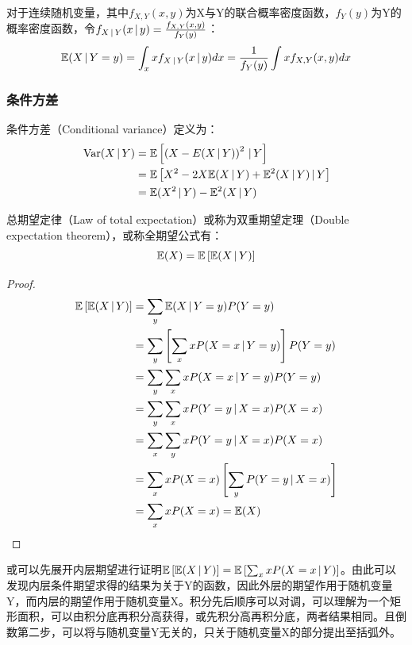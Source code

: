 \documentclass[11pt]{article}
\begin{document}
对于连续随机变量，其中$f_{X,Y}(x,y)$为X与Y的联合概率密度函数，$f_Y(y)$为Y的概率密度函数，令$f_{X\,\vert\, Y}(x\,\vert\, y) = \frac{f_{X,Y}(x,y)}{f_Y(y)}$：
\begin{equation*}
    \mathbb{E}(X\,\vert\, Y=y) = \int_x x f_{X\,\vert\, Y}(x\,\vert\, y) dx = \frac{1}{f_Y(y)} \int x f_{X,Y}(x,y) dx
\end{equation*}

\subsubsection{条件方差}

条件方差（Conditional variance）定义为：
\begin{align*}
    \operatorname{Var}(X\,\vert\, Y) &= \mathbb{E} \left[\left( X-E(X\,\vert\, Y) \right)^2 \,\vert\, Y \right] \\
    &= \mathbb{E} \left[ X^2 - 2X\mathbb{E}(X\,\vert\, Y) + \mathbb{E}^2(X\,\vert\, Y) \,\vert\, Y \right] \\
    &= \mathbb{E} (X^2\,\vert\, Y) - \mathbb{E}^2(X\,\vert\, Y)
\end{align*}

\begin{proposition}
    总期望定律（Law of total expectation）或称为双重期望定理（Double expectation theorem），或称全期望公式有：
    \begin{equation*}
        \mathbb{E}(X) = \mathbb{E}\left[ \mathbb{E}(X\,\vert\, Y) \right]
    \end{equation*}
    
    \begin{proof}
        \begin{align*}
            \mathbb{E}\left[ \mathbb{E}(X\,\vert\, Y) \right]
            &= \sum_y \mathbb{E}(X\,\vert\, Y=y) P(Y=y)\\
            &= \sum_y \left[ \sum_x x P(X=x\,\vert\, Y=y) \right] P(Y=y) \\
            &= \sum_y \sum_x x P(X=x\,\vert\, Y=y) P(Y=y) \\
            &= \sum_y \sum_x x P(Y=y\,\vert\, X=x) P(X=x) \\
            &= \sum_x \sum_y x P(Y=y\,\vert\, X=x) P(X=x) \\
            &= \sum_x x P(X=x) \left[ \sum_y P(Y=y\,\vert\, X=x)\right] \\
            &= \sum_x x P(X=x) = \mathbb{E}(X)
        \end{align*}
    \end{proof}
\end{proposition}

\begin{remark}
    或可以先展开内层期望进行证明$\mathbb{E}\left[ \mathbb{E}(X\,\vert\, Y) \right] = \mathbb{E}\left[ \sum_x x P(X=x\,\vert\, Y) \right]$。由此可以发现内层条件期望求得的结果为关于Y的函数，因此外层的期望作用于随机变量Y，而内层的期望作用于随机变量X。积分先后顺序可以对调，可以理解为一个矩形面积，可以由积分底再积分高获得，或先积分高再积分底，两者结果相同。且倒数第二步，可以将与随机变量Y无关的，只关于随机变量X的部分提出至括弧外。
\end{remark}
\end{document}
